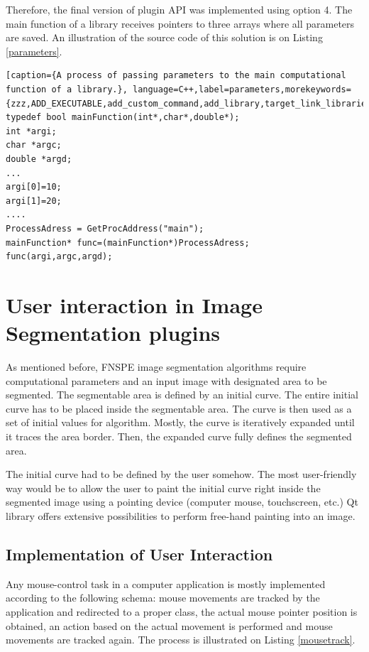 Therefore, the final version of plugin API was implemented using option 4. The main function of a library receives pointers to three arrays where all parameters are saved. An illustration of the source code of this solution is on Listing \ref{parameters}.

\begin{lstlisting}[caption={A process of passing parameters to the main computational function of a library.}, language=C++,label=parameters,morekeywords={zzz,ADD_EXECUTABLE,add_custom_command,add_library,target_link_libraries,OUTPUT,COMMAND,xxx})]
typedef bool mainFunction(int*,char*,double*);
int *argi;
char *argc;
double *argd;
...
argi[0]=10;
argi[1]=20;
....
ProcessAdress = GetProcAddress("main");
mainFunction* func=(mainFunction*)ProcessAdress;
func(argi,argc,argd);
\end{lstlisting}

\section{User interaction in Image Segmentation plugins}
As mentioned before, FNSPE image segmentation algorithms require computational parameters and an input image with designated area to be segmented. The segmentable area is defined by an initial curve. The entire initial curve has to be placed inside the segmentable area. The curve is then used as a set of initial values for algorithm. Mostly, the curve is iteratively expanded until it traces the area border. Then, the expanded curve fully defines the segmented area.

The initial curve had to be defined by the user somehow. The most user-friendly way would be to allow the user to paint the initial curve right inside the segmented image using a pointing device (computer mouse, touchscreen, etc.) Qt library offers extensive possibilities to perform free-hand painting into an image.

\subsection{Implementation of User Interaction}

Any mouse-control task in a computer application is mostly implemented according to the following schema: mouse movements are tracked by the application and redirected to a proper class, the actual mouse pointer position is obtained, an action based on the actual movement is performed and mouse movements are tracked again. The process is illustrated on Listing \ref{mousetrack}.

